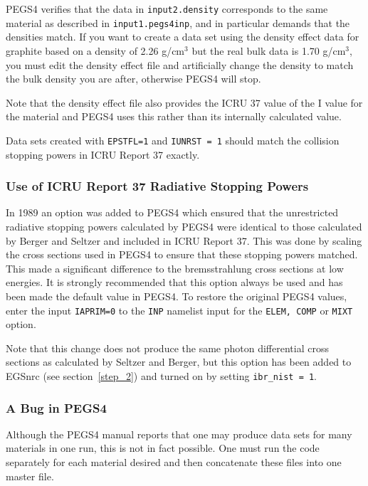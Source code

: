 PEGS4 verifies that the data in {\tt input2.density} corresponds to the same
material as described in {\tt input1.pegs4inp}, and in particular demands
that the densities match.  If you want to create a data set using the
density effect data for graphite based on a density of 2.26 g/cm$^3$ but
the real bulk data is 1.70 g/cm$^3$, you must edit the density effect file
and artificially change the density to match the bulk density you are
after, otherwise PEGS4 will stop.

Note that the density effect file also provides the ICRU 37 value of the I
value for the material and PEGS4 uses this rather than its internally
calculated value.

Data sets created with {\tt EPSTFL=1} and {\tt IUNRST = 1} should match the
collision stopping powers in ICRU Report 37 exactly.

\subsubsection{Use of ICRU Report 37 Radiative Stopping Powers}
In 1989 an option was added to PEGS4\cite{Ro89a} which ensured that
the unrestricted radiative stopping powers calculated by PEGS4 were
identical to those calculated by Berger and Seltzer\cite{BS83} and
included in ICRU Report 37\cite{ICRU37}.  This was done by scaling the
cross sections used in PEGS4 to ensure that these stopping powers matched.
This made a significant difference to the bremsstrahlung cross sections
at low energies.  It is strongly recommended that this option always
be used and has been made the default value in PEGS4. To restore the 
original PEGS4 values, enter  the input {\tt IAPRIM=0}
to the {\tt INP} namelist input for the {\tt ELEM, COMP} or {\tt MIXT}
option.


Note that this change does not produce the same photon differential cross
sections as calculated by Seltzer and Berger\cite{SB85}, but this option
has been added to EGSnrc (see section~\ref{step_2}) and turned on by
setting {\tt ibr\_nist = 1}.



\subsubsection{A Bug in PEGS4}
Although the PEGS4 manual reports that one may produce data sets for many
materials in one run, this is not in fact possible.  One must run the code
separately for each material desired and then concatenate these files into
one master file.

